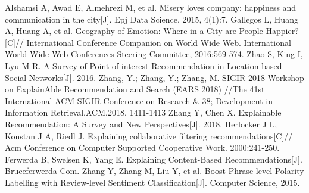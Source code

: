 \documentclass[runningheads]{llncs}
\begin{document}
\begin{thebibliography}{25}
Alshamsi A, Awad E, Almehrezi M, et al. Misery loves company: happiness and communication in the city[J]. Epj Data Science, 2015, 4(1):7.
Gallegos L, Huang A, Huang A, et al. Geography of Emotion: Where in a City are People Happier?[C]// International Conference Companion on World Wide Web. International World Wide Web Conferences Steering Committee, 2016:569-574.
Zhao S, King I, Lyu M R. A Survey of Point-of-interest Recommendation in Location-based Social Networks[J]. 2016.
 Zhang, Y.; Zhang, Y.; Zhang, M. SIGIR 2018 Workshop on ExplainAble Recommendation and Search (EARS 2018) //The 41st International ACM SIGIR Conference on Research \& 38; Development in Information Retrieval,ACM,2018, 1411-1413 
 Zhang Y, Chen X. Explainable Recommendation: A Survey and New Perspectives[J]. 2018.
 Herlocker J L, Konstan J A, Riedl J. Explaining collaborative filtering recommendations[C]// Acm Conference on Computer Supported Cooperative Work. 2000:241-250.
 Ferwerda B, Swelsen K, Yang E. Explaining Content-Based Recommendations[J]. Bruceferwerda Com.
  Zhang Y, Zhang M, Liu Y, et al. Boost Phrase-level Polarity Labelling with Review-level Sentiment Classification[J]. Computer Science, 2015.

\end{thebibliography}
\end{document}
